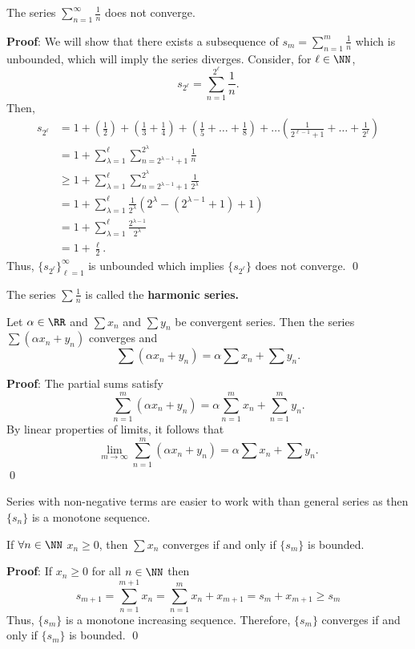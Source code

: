 \begin{theorem}
The series $\sum_{n=1}^\infty \frac{1}{n}$ does not converge.
\end{theorem}
\textbf{Proof}: We will show that there exists a subsequence of $s_m = \sum_{n=1}^m \frac{1}{n}$ which is unbounded, which will imply the series diverges. Consider, for $\ell \in \NN$, 
\[
s_{2^\ell} = \sum_{n=1}^{2^\ell} \frac{1}{n}.
\]
Then,
\begin{align*}
    s_{2^\ell} &= 1+\left(\frac{1}{2}\right) + \left(\frac{1}{3} + \frac{1}{4}\right) + \left(\frac{1}{5} + \dots + \frac{1}{8} \right)  + \dots \left(\frac{1}{2^{\ell-1}+1} + \dots + \frac{1}{2^\ell}\right) \\
    &= 1 + \sum_{\lambda = 1}^\ell \sum_{n=2^{\lambda-1}+1}^{2^\lambda} \frac{1}{n} \\
    &\geq 1 + \sum_{\lambda = 1}^\ell \sum_{n=2^{\lambda-1}+1}^{2^\lambda} \frac{1}{2^\lambda} \\
    &= 1 + \sum_{\lambda = 1}^\ell \frac{1}{2^\lambda}(2^\lambda - (2^{\lambda-1}+1)+1) \\
    &= 1 + \sum_{\lambda = 1}^\ell \frac{2^{\lambda-1}}{2^\lambda} \\
    &= 1 + \frac{\ell}{2}.
\end{align*}
Thus, $\{s_{2^\ell}\}_{\ell=1}^\infty$ is unbounded which implies $\{s_{2^\ell}\}$ does not converge. \qed 

\begin{remark}
The series $\sum \frac{1}{n}$ is called the \textbf{harmonic series.}
\end{remark}

\begin{theorem}
Let $\alpha \in \RR$ and $\sum x_n$ and $\sum y_n$ be convergent series. Then the series $\sum (\alpha x_n + y_n)$ converges and 
\[
\sum (\alpha x_n + y_n) = \alpha \sum x_n + \sum y_n.
\]
\end{theorem}
\textbf{Proof}: The partial sums satisfy
\[
\sum_{n=1}^m (\alpha x_n + y_n) = \alpha \sum_{n=1}^m x_n + \sum_{n=1}^m y_n.
\]
By linear properties of limits, it follows that 
\[
\lim_{m\to \infty} \sum_{n=1}^m (\alpha x_n +y_n) = \alpha \sum x_n + \sum y_n.
\] \qed 

\noindent Series with non-negative terms are easier to work with than general series as then $\{s_n\}$ is a monotone sequence.

\begin{theorem}
If $\forall n \in \NN$ $x_n \geq 0$, then $\sum x_n$ converges if and only if $\{s_m\}$ is bounded. 
\end{theorem}
\textbf{Proof}: If $x_n \geq 0$ for all $n\in \NN$ then 
\[
s_{m+1} = \sum_{n=1}^{m+1} x_n = \sum_{n=1}^m x_n + x_{m+1} = s_m  + x_{m+1} \geq s_m
\]
Thus, $\{s_m\}$ is a monotone increasing sequence. Therefore, $\{s_m\}$ converges if and only if $\{s_m\}$ is bounded. \qed 

